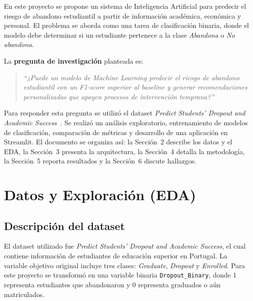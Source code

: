 \documentclass[10pt,twocolumn]{article}
\begin{document}
En este proyecto se propone un sistema de Inteligencia Artificial para
predecir el riesgo de abandono estudiantil a partir de información
académica, económica y personal. El problema se aborda como una tarea de
clasificación binaria, donde el modelo debe determinar si un estudiante
pertenece a la clase \textit{Abandona} o \textit{No abandona}.

La \textbf{pregunta de investigación} planteada es:
\begin{quote}
  \textit{``¿Puede un modelo de Machine Learning predecir el riesgo de
  abandono estudiantil con un F1-score superior al baseline y generar
  recomendaciones personalizadas que apoyen procesos de intervención
  temprana?''}
\end{quote}

Para responder esta pregunta se utilizó el dataset \textit{Predict
Students' Dropout and Academic Success}~\cite{dataset2022}. Se realizó
un análisis exploratorio, entrenamiento de modelos de clasificación,
comparación de métricas y desarrollo de una aplicación en Streamlit.
El documento se organiza así: la Sección~2 describe los datos y el EDA,
la Sección~3 presenta la arquitectura, la Sección~4 detalla la metodología,
la Sección~5 reporta resultados y la Sección~6 discute hallazgos.

\section{Datos y Exploración (EDA)}

\subsection{Descripción del dataset}

El dataset utilizado fue \textit{Predict Students' Dropout and Academic
Success}, el cual contiene información de estudiantes de educación superior
en Portugal. La variable objetivo original incluye tres clases:
\textit{Graduate}, \textit{Dropout} y \textit{Enrolled}. Para este proyecto
se transformó en una variable binaria \texttt{Dropout\_Binary}, donde 1
representa estudiantes que abandonaron y 0 representa graduados o aún
matriculados.
\end{document}
